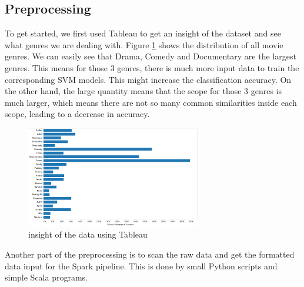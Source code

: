 \documentclass{vldb}
\begin{document}
\subsection{Preprocessing}
\par To get started, we first used Tableau to get an insight of the dataset and see what genres we are dealing with. Figure \ref{fig:tableau} shows the distribution of all movie genres. We can easily see that Drama, Comedy and Documentary are the largest genres. This means for those 3 genres, there is much more input data to train the corresponding SVM models. This might increase the classification accuracy. On the other hand, the large quantity means that the scope for those 3 genres is much larger, which means there are not so many common similarities inside each scope, leading to a decrease in accuracy.
\begin{figure}
\begin{center}
\includegraphics[width=3.00in]{genresContribution.png}
\caption{insight of the data using Tableau}
\label{fig:tableau}
\end{center}
\end{figure} 
\par Another part of the preprocessing is to scan the raw data and get the formatted data input for the Spark pipeline. This is done by small Python scripts and simple Scala programs.
\end{document}
